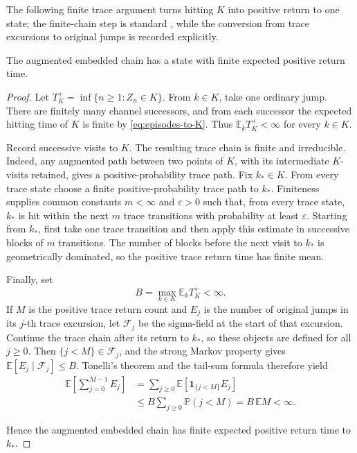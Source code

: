 The following finite trace argument turns hitting \(K\) into positive return
to one state; the finite-chain step is standard \citep{Norris1997}, while the
conversion from trace excursions to original jumps is recorded explicitly.

\begin{proposition}\label{prop:trace}
The augmented embedded chain has a state with finite expected positive return
time.
\end{proposition}

\begin{proof}
Let \(T_K^+=\inf\{n\ge1:Z_n\in K\}\).  From \(k\in K\), take one ordinary
jump.  There are finitely many channel successors, and from each successor
the expected hitting time of \(K\) is finite by \eqref{eq:episodes-to-K}.
Thus \(\mathbb E_kT_K^+<\infty\) for every \(k\in K\).

Record successive visits to \(K\).  The resulting trace chain is finite and
irreducible.  Indeed, any augmented path between two points of \(K\), with
its intermediate \(K\)-visits retained, gives a positive-probability trace
path.  Fix \(k_*\in K\).  From every trace state choose a finite
positive-probability trace path to \(k_*\).  Finiteness supplies common
constants \(m<\infty\) and \(\varepsilon>0\) such that, from every trace
state, \(k_*\) is hit within the next \(m\) trace transitions with probability
at least \(\varepsilon\).  Starting from \(k_*\), first take one trace
transition and then apply this estimate in successive blocks of \(m\)
transitions.  The number of blocks before the next visit to \(k_*\) is
geometrically dominated, so the positive trace return time has finite mean.

Finally, set
\[
  B=\max_{k\in K}\mathbb E_kT_K^+<\infty.
\]
If \(M\) is the positive trace return count and \(E_j\) is the number of
original jumps in its \(j\)-th trace excursion, let \(\mathcal F_j\) be the
sigma-field at the start of that excursion.  Continue the trace chain after
its return to \(k_*\), so these objects are defined for all \(j\ge0\).  Then
\(\{j<M\}\in\mathcal F_j\), and the strong Markov property gives
\(\mathbb E[E_j\mid\mathcal F_j]\le B\).  Tonelli's theorem and the tail-sum
formula therefore yield
\[
\begin{aligned}
  \mathbb E\!\left[\sum_{j=0}^{M-1}E_j\right]
  &=\sum_{j\ge0}\mathbb E\!\left[
      \mathbf1_{\{j<M\}}E_j\right]\\
  &\le B\sum_{j\ge0}\mathbb P(j<M)
   =B\,\mathbb E M<\infty.
\end{aligned}
\]

\noindent
Hence the augmented embedded chain has finite expected positive return time
to \(k_*\).
\end{proof}

